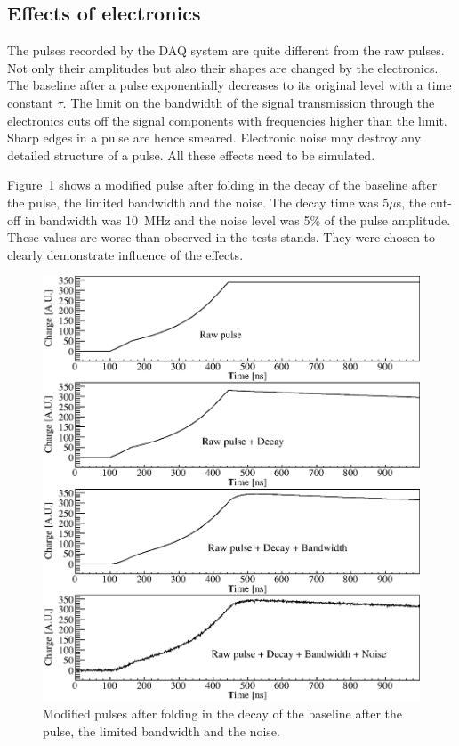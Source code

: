 \documentclass[epj]{svjour}
\begin{document}
\subsection{Effects of electronics} 
\label{s:dbn}
The pulses recorded by the DAQ system are quite different from the raw
pulses. Not only their amplitudes but also their shapes are changed by
the electronics. The baseline after a pulse exponentially decreases to
its original level with a time constant $\tau$. The limit on the
bandwidth of the signal transmission through the electronics cuts off
the signal components with frequencies higher than the limit. Sharp
edges in a pulse are hence smeared. Electronic noise may destroy any
detailed structure of a pulse. All these effects need to be simulated.
 
Figure~\ref{f:elec} shows a modified pulse after folding in the decay
of the baseline after the pulse, the limited bandwidth and the
noise. The decay time was $5 \mu$s, the cut-off in bandwidth was
10~MHz and the noise level was 5\% of the pulse amplitude. These
values are worse than observed in the tests stands. They were chosen
to clearly demonstrate influence of the effects.
\begin{figure}
\includegraphics[width=\linewidth]{PSDBN} 
\caption{Modified pulses after folding in the decay of the baseline
after the pulse, the limited bandwidth and the noise.}
\label{f:elec} 
\end{figure}
\end{document}
